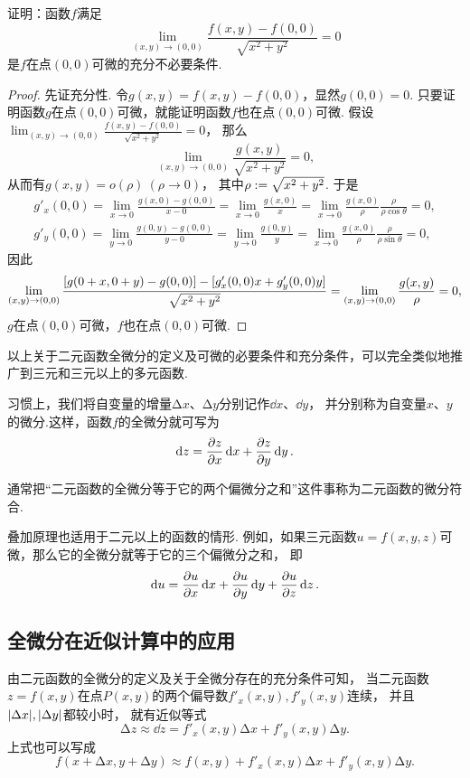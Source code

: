 \begin{example}
证明：函数\(f\)满足\[
	\lim_{(x,y)\to(0,0)} \frac{f(x,y) - f(0,0)}{\sqrt{x^2+y^2}} = 0
\]是\(f\)在点\((0,0)\)可微的充分不必要条件.
\begin{proof}
先证充分性.
令\(g(x,y) = f(x,y) - f(0,0)\)，显然\(g(0,0) = 0\).
只要证明函数\(g\)在点\((0,0)\)可微，就能证明函数\(f\)也在点\((0,0)\)可微.
假设\(\lim_{(x,y)\to(0,0)} \frac{f(x,y) - f(0,0)}{\sqrt{x^2+y^2}} = 0\)，
那么\[
	\lim_{(x,y)\to(0,0)} \frac{g(x,y)}{\sqrt{x^2+y^2}} = 0,
\]
从而有\(g(x,y) = o(\rho)\ (\rho\to0)\)，
其中\(\rho := \sqrt{x^2 + y^2}\).
于是\begin{gather*}
	g'_x(0,0) = \lim_{x\to0} \frac{g(x,0) - g(0,0)}{x - 0}
	= \lim_{x\to0} \frac{g(x,0)}{x} %
	= \lim_{x\to0} \frac{g(x,0)}{\rho} \frac{\rho}{\rho \cos\theta}
	= 0, \\
	g'_y(0,0) = \lim_{y\to0} \frac{g(0,y) - g(0,0)}{y - 0}
	= \lim_{y\to0} \frac{g(0,y)}{y} %
	= \lim_{x\to0} \frac{g(x,0)}{\rho} \frac{\rho}{\rho \sin\theta}
	= 0,
\end{gather*}
因此\[
	\lim_{(x,y)\to(0,0)} \frac{[g(0+x,0+y) - g(0,0)] - [g'_x(0,0) x + g'_y(0,0) y]}{\sqrt{x^2+y^2}} \\
	= \lim_{(x,y)\to(0,0)} \frac{g(x,y)}{\rho}
	= 0,
\]
\(g\)在点\((0,0)\)可微，\(f\)也在点\((0,0)\)可微.
\end{proof}
\end{example}

以上关于二元函数全微分的定义及可微的必要条件和充分条件，可以完全类似地推广到三元和三元以上的多元函数.

习惯上，我们将自变量的增量\(\increment x\)、\(\increment y\)分别记作\(\dd{x}\)、\(\dd{y}\)，
并分别称为自变量\(x\)、\(y\)的微分.这样，函数\(f\)的全微分就可写为\[
	\dd{z}=\pdv{z}{x}\dd{x}+\pdv{z}{y}\dd{y}.
\]

通常把“二元函数的全微分等于它的两个偏微分之和”这件事称为二元函数的微分符合.

叠加原理也适用于二元以上的函数的情形.
例如，如果三元函数\(u = f(x,y,z)\)可微，那么它的全微分就等于它的三个偏微分之和，
即\[
	\dd{u} = \pdv{u}{x} \dd{x} + \pdv{u}{y} \dd{y} + \pdv{u}{z} \dd{z}.
\]

\subsection{全微分在近似计算中的应用}
由二元函数的全微分的定义及关于全微分存在的充分条件可知，
当二元函数\(z = f(x,y)\)在点\(P(x,y)\)的两个偏导数\(f'_x(x,y),f'_y(x,y)\)连续，
并且\(\abs{\Delta x},\abs{\Delta y}\)都较小时，
就有近似等式\[
	\increment z \approx \dd{z} = f'_x(x,y) \increment x + f'_y(x,y) \increment y.
\]
上式也可以写成\[
	f(x+\increment x,y+\increment y) \approx f(x,y) + f'_x(x,y) \increment x + f'_y(x,y) \increment y.
\]

